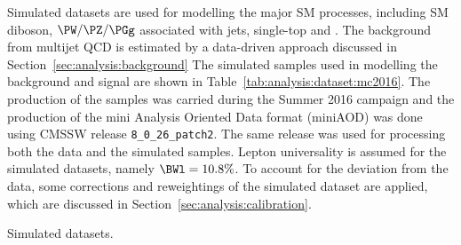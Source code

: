 Simulated datasets are used for modelling the major SM processes, including SM diboson, $\PW/\PZ/\PGg$ associated with jets, single-top and \ttbar. The background from multijet QCD is estimated by a data-driven approach discussed in Section~\ref{sec:analysis:background} The simulated samples used in modelling the background and signal are shown in Table~\ref{tab:analysis:dataset:mc2016}.  The production of the samples was carried during the Summer 2016 campaign and the production of the mini Analysis Oriented Data format (miniAOD) was done using CMSSW release \texttt{8\_0\_26\_patch2}. The same release was used for processing both the data and the simulated samples. Lepton universality is assumed for the simulated datasets, namely $ \BWl = 10.8\%$. To account for the deviation from the data, some corrections and reweightings of the simulated dataset are applied, which are discussed in Section~\ref{sec:analysis:calibration}.

\begin{table}[ht]
    \centering
    \setlength{\tabcolsep}{2em}
    \renewcommand{\arraystretch}{1.3}
    \caption{Simulated datasets.} \label{tab:analysis:dataset:mc2016}

    
\end{table}












